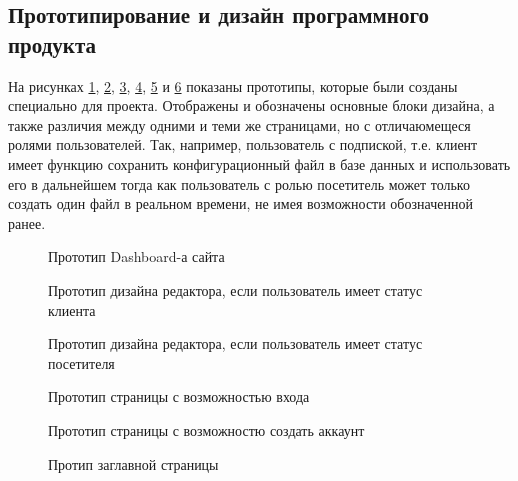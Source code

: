 \subsection{Прототипирование и дизайн программного продукта}

На рисунках \ref{des:proto_1}, \ref{des:proto_2}, \ref{des:proto_3}, \ref{des:proto_4}, \ref{des:proto_5} и
\ref{des:proto_6} показаны прототипы, которые были созданы специально для проекта. Отображены и обозначены основные блоки дизайна, а также различия между
одними и теми же страницами, но с отличаюмещеся ролями пользователей. Так, например, пользователь с подпиской, т.е. клиент имеет функцию сохранить конфигурационный файл
в базе данных и использовать его в дальнейшем тогда как пользователь с ролью посетитель может только создать один файл в реальном времени, не имея возможности обозначенной ранее.

\begin{figure}[H]
    \caption{Прототип Dashboard-а сайта}
    \label{des:proto_1}
\end{figure}

\begin{figure}[H]
    \caption{Прототип дизайна редактора, если пользователь имеет статус клиента}
    \label{des:proto_2}
\end{figure}

\begin{figure}[H]
    \caption{Прототип дизайна редактора, если пользователь имеет статус посетителя}
    \label{des:proto_3}
\end{figure}

\begin{figure}[H]
    \caption{Прототип страницы с возможностью входа}
    \label{des:proto_4}
\end{figure}

\begin{figure}[H]
    \caption{Прототип страницы с возможностю создать аккаунт}
    \label{des:proto_5}
\end{figure}

\begin{figure}[H]
    \caption{Протип заглавной страницы}
    \label{des:proto_6}
\end{figure}

